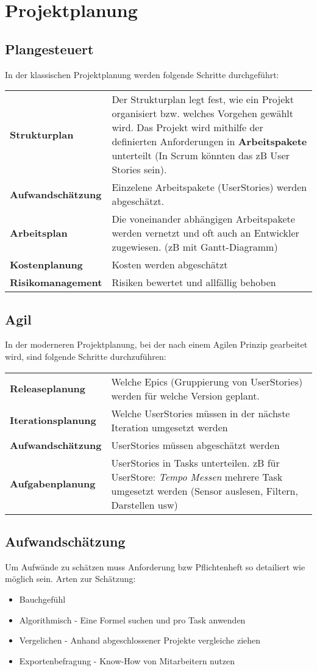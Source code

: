 \section{Projektplanung}
\subsection{Plangesteuert}
In der klassischen Projektplanung werden folgende Schritte durchgeführt:\\
\begin{tabular}{lm{5.5cm}}
	\textbf{Strukturplan} & Der Strukturplan legt fest, wie ein Projekt organisiert bzw. welches Vorgehen gewählt wird. Das Projekt wird mithilfe der definierten Anforderungen in \textbf{Arbeitspakete} unterteilt (In Scrum könnten das zB User Stories sein). \\
	\textbf{Aufwandschätzung} & Einzelene Arbeitspakete (UserStories) werden abgeschätzt.\\
	\textbf{Arbeitsplan} & Die voneinander abhängigen Arbeitspakete werden vernetzt und oft auch an Entwickler zugewiesen. (zB mit Gantt-Diagramm) \\
	\textbf{Kostenplanung} & Kosten werden abgeschätzt \\
	\textbf{Risikomanagement} & Risiken bewertet und allfällig behoben
\end{tabular}

\subsection{Agil}
In der moderneren Projektplanung, bei der nach einem Agilen Prinzip gearbeitet wird, sind folgende Schritte durchzuführen:
\begin{tabular}{lm{5.5cm}}
	\textbf{Releaseplanung} & Welche Epics (Gruppierung von UserStories) werden für welche Version geplant. \\
	\textbf{Iterationsplanung} & Welche UserStories müssen in der nächste Iteration umgesetzt werden \\
	\textbf{Aufwandschätzung} & UserStories müssen abgeschätzt werden \\
	\textbf{Aufgabenplanung} & UserStories in Tasks unterteilen. zB für UserStore: \textit{Tempo Messen} mehrere Task umgesetzt werden (Sensor auslesen, Filtern, Darstellen usw)
\end{tabular}

\subsection{Aufwandschätzung}
Um Aufwände zu schätzen muss Anforderung bzw Pflichtenheft so detailiert wie möglich sein. Arten zur Schätzung:
\begin{itemize}[nosep]
	\item Bauchgefühl
	\item Algorithmisch - Eine Formel suchen und pro Task anwenden
	\item Vergelichen - Anhand abgeschlossener Projekte vergleiche ziehen
	\item Exportenbefragung - Know-How von Mitarbeitern nutzen
\end{itemize}

